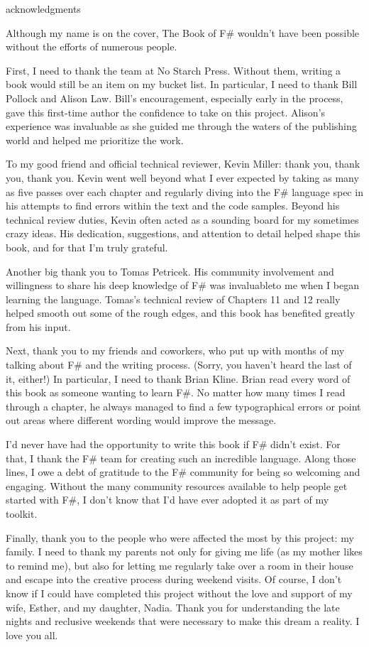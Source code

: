 \documentclass{book}
\begin{document}
acknowledgments

Although my name is on the cover, The Book of F\# wouldn’t have been possible without the efforts of numerous people.

First, I need to thank the team at No Starch Press. Without them, writing a book would still be an item on my bucket list. In particular, I need to thank Bill Pollock and Alison Law. Bill’s encouragement, especially early in the process, gave this first-time author the confidence to take on this project. Alison’s experience was invaluable as she guided me through the waters of the publishing world and helped me prioritize the work.

To my good friend and official technical reviewer, Kevin Miller: thank you, thank you, thank you. Kevin went well beyond what I ever expected by taking as many as five passes over each chapter and regularly diving into the F\# language spec in his attempts to find errors within the text and the code samples. Beyond his technical review duties, Kevin often acted as a sounding board for my sometimes crazy ideas. His dedication, suggestions, and attention to detail helped shape this book, and for that I’m truly grateful.

Another big thank you to Tomas Petricek. His community involvement and willingness to share his deep knowledge of F\# was invaluableto me when I began learning the language. Tomas’s technical review of Chapters 11 and 12 really helped smooth out some of the rough edges, and this book has benefited greatly from his input.

Next, thank you to my friends and coworkers, who put up with months of my talking about F\# and the writing process. (Sorry, you haven’t heard the last of it, either!) In particular, I need to thank Brian Kline. Brian read every word of this book as someone wanting to learn F\#. No matter how many times I read through a chapter, he always managed to find a few typographical errors or point out areas where different wording would improve the message.

I’d never have had the opportunity to write this book if F\# didn’t exist. For that, I thank the F\# team for creating such an incredible language. Along those lines, I owe a debt of gratitude to the F\# community for being so welcoming and engaging. Without the many community resources available to help people get started with F\#, I don’t know that I’d have ever adopted it as part of my toolkit.

Finally, thank you to the people who were affected the most by this project: my family. I need to thank my parents not only for giving me life (as my mother likes to remind me), but also for letting me regularly take over a room in their house and escape into the creative process during weekend visits. Of course, I don’t know if I could have completed this project without the love and support of my wife, Esther, and my daughter, Nadia. Thank you for understanding the late nights and reclusive weekends that were necessary to make this dream a reality. I love you all.
\end{document}
